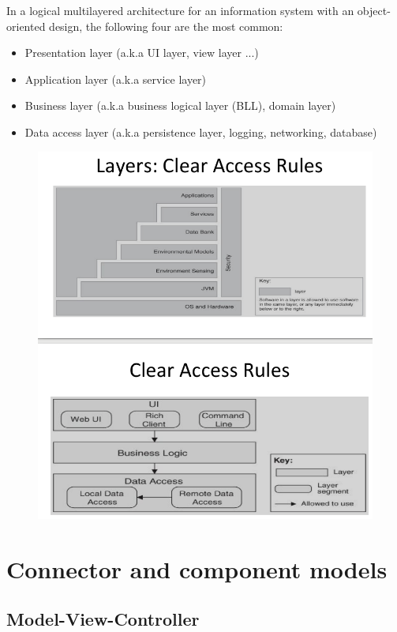 \documentclass[a4paper]{report}
\begin{document}
In a logical multilayered architecture for an
information system with an object-oriented design,
the following four are the most common:

\begin{itemize}
\item
  Presentation layer (a.k.a UI layer, view layer ...)
\item
  Application layer (a.k.a service layer)
\item
  Business layer (a.k.a business logical layer (BLL), domain layer)
\item
  Data access layer (a.k.a persistence layer, logging, networking, database)
\end{itemize}

\begin{figure}[H]
\centering
  \includegraphics[width=1\linewidth]
  {images/access_rules.png}
\end{figure}

\section{Connector and component models}

\subsection{Model-View-Controller}
\end{document}
